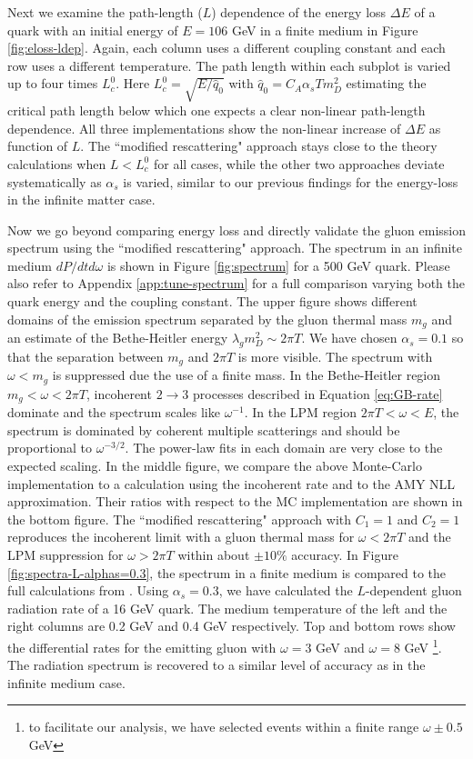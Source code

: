 \documentclass[aps, prc, reprint, amsmath, groupedaddress, nofootinbib]{revtex4-1}
\begin{document}
Next we examine the path-length ($L$) dependence of the energy loss $\Delta E$ of a quark with an initial energy of $E = 106$ GeV in a finite medium in Figure \ref{fig:eloss-ldep}.
Again, each column uses a different coupling constant and each row uses a different temperature. 
The path length within each subplot is varied up to four times $L_c^0$.
Here $L_c^0 = \sqrt{E/\hat{q}_0}$ with $\hat{q}_0 = C_A \alpha_s T m_D^2$ estimating the critical path length below which one expects a clear non-linear path-length dependence.
All three implementations show the non-linear increase of $\Delta E$ as function of $L$.
The ``modified rescattering" approach stays close to the theory calculations when $L<L_c^0$ for all cases, while the other two approaches deviate systematically as $\alpha_s$ is varied, similar to our previous findings for the energy-loss in the infinite matter case.

Now we go beyond comparing energy loss and directly validate the gluon emission spectrum using the ``modified rescattering" approach. 
The spectrum in an infinite medium $dP/dtd\omega$ is shown in Figure \ref{fig:spectrum} for a 500 GeV quark.
Please also refer to Appendix \ref{app:tune-spectrum} for a full comparison varying both the quark energy and the coupling constant.
The upper figure shows different domains of the emission spectrum separated by the gluon thermal mass $m_g$ and an estimate of the Bethe-Heitler energy $\lambda_g m_D^2 \sim 2\pi T$.
We have chosen $\alpha_s = 0.1$ so that the separation between $m_g$ and $2\pi T$ is more visible.
The spectrum with $\omega < m_g$ is suppressed due the use of a finite mass.
In the Bethe-Heitler region $m_g < \omega < 2\pi T$, incoherent $2\rightarrow 3$ processes described in Equation \ref{eq:GB-rate} dominate and the spectrum scales like $\omega^{-1}$.
In the LPM region $2\pi T < \omega < E$, the spectrum is dominated by coherent multiple scatterings and should be proportional to $\omega^{-3/2}$.
The power-law fits in each domain are very close to the expected scaling.
In the middle figure, we compare the above Monte-Carlo implementation to a calculation using the incoherent rate and to the AMY NLL approximation. 
Their ratios with respect to the MC implementation are shown in the bottom figure.
The ``modified rescattering" approach with $C_1 = 1$ and $C_2 = 1$ reproduces the incoherent limit with a gluon thermal mass for $\omega < 2\pi T$ and the LPM suppression for $\omega > 2\pi T$ within about $\pm 10\%$ accuracy.
In Figure \ref{fig:spectra-L-alphas=0.3}, the spectrum in a finite medium is compared to the full calculations from \cite{CaronHuot:2010bp}.
Using $\alpha_s = 0.3$, we have calculated the $L$-dependent gluon radiation rate of a 16 GeV quark.
The medium temperature of the left and the right columns are 0.2 GeV and 0.4 GeV respectively.
Top and bottom rows show the differential rates for the emitting gluon with $\omega = 3$ GeV and $\omega = 8$ GeV \footnote{to facilitate our analysis, we have selected events within a finite range $\omega\pm 0.5$ GeV}.
The radiation spectrum is recovered to a similar level of accuracy as in the infinite medium case.
\end{document}
